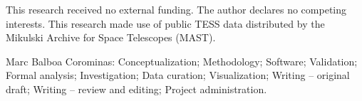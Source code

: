 \documentclass[manuscript,linenumbers]{aastex702}
\begin{document}
\begin{acknowledgments}
This research received no external funding. The author declares no competing interests. This research made use of public TESS data distributed by the Mikulski Archive for Space Telescopes (MAST).
\end{acknowledgments}


\begin{contribution}
Marc Balboa Corominas: Conceptualization; Methodology; Software; Validation; Formal analysis; Investigation; Data curation; Visualization; Writing -- original draft; Writing -- review and editing; Project administration.
\end{contribution}



\end{document}
